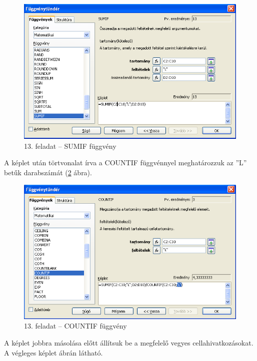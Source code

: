 \begin{figure}[!h]
\begin{center}
\includegraphics[width=13.999cm]{oocalcv1-img74.png}
\caption{13. feladat -- SUMIF függvény}\label{13-feladatSUMIF}
\end{center}
\end{figure}

A képlet után törtvonalat írva a COUNTIF függvénnyel
meghatározzuk az ''L'' betűk
darabszámát (\ref{13-feladatCOUNTIF} ábra).

\begin{figure}[!h]
\begin{center}
\includegraphics[width=13.999cm]{oocalcv1-img75.png}
\caption{13. feladat -- COUNTIF függvény}\label{13-feladatCOUNTIF}
\end{center}
\end{figure}

A képlet jobbra másolása előtt állítsuk be a megfelelő
vegyes cellahivatkozásokat. A végleges képlet
 ábrán látható.

